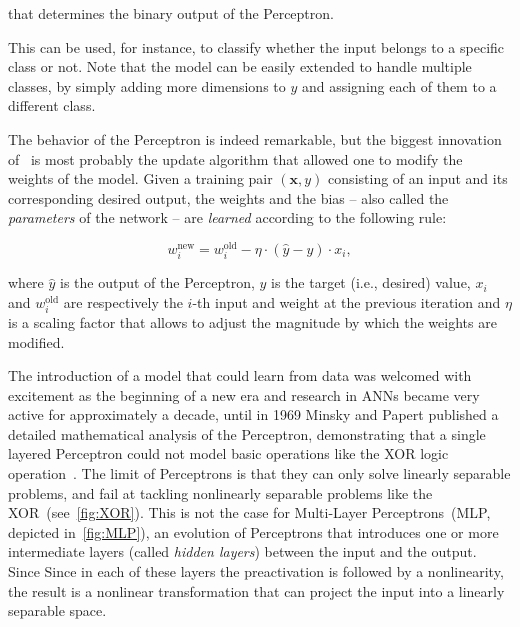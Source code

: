 \noindent that determines the binary output of the Perceptron.

This can be used, for instance, to classify whether the input belongs to a
specific class or not. Note that the model can be easily extended to handle
multiple classes, by simply adding more dimensions to $y$ and assigning each of
them to a different class.

The behavior of the Perceptron is indeed remarkable, but the biggest innovation
of~\cite{Rosenblatt57} is most probably the update algorithm that allowed one
to modify the weights of the model. Given a training pair $(\mathbf{x}, y)$
consisting of an input and its corresponding desired output, the weights and
the bias -- also called the \emph{parameters} of the network -- are
\emph{learned} according to the following rule:

\begin{equation}\label{eq:perceptron_lr}
    w_i^{\text{new}} = w_i^{\text{old}} - \eta \cdot (\hat {y} - y) \cdot x_i,
\end{equation}

\noindent where $\hat y$ is the output of the Perceptron, $y$ is the target
(i.e., desired) value, $x_i$ and $w_i^{\text{old}}$ are respectively the $i$-th
input and weight at the previous iteration and $\eta$ is a scaling factor that
allows to adjust the magnitude by which the weights are modified.

The introduction of a model that could learn from data
was welcomed with excitement as the beginning of a new era and
research in ANNs became very active for approximately a decade, until in
1969 Minsky and Papert published a detailed mathematical analysis of the
Perceptron, demonstrating that a single layered Perceptron could not model
basic operations like the XOR logic operation~\citep{Minsky69}. The limit of
Perceptrons is that they can only solve linearly separable problems, and fail
at tackling nonlinearly separable problems like the
XOR~(see~\autoref{fig:XOR}). This is not the case for Multi-Layer
Perceptrons~(MLP, depicted in~\autoref{fig:MLP}), an evolution of Perceptrons
that introduces one or more intermediate layers (called \emph{hidden layers})
between the input and the output. Since Since in each of these layers the
preactivation is followed by a nonlinearity, the result is a nonlinear
transformation that can project the input into a linearly separable space.

